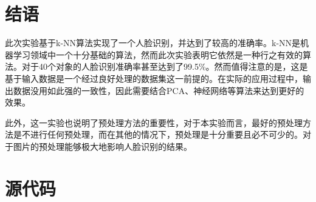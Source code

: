 \documentclass{article}
\begin{document}
\FloatBarrier
\section{结语}
\label{sec:jie_yu_}
\par 此次实验基于k-NN算法实现了一个人脸识别，并达到了较高的准确率。k-NN是机器学习领域中一个十分基础的算法，然而此次实验表明它依然是一种行之有效的算法。对于40个对象的人脸识别准确率甚至达到了99.5\%。然而值得注意的是，这是基于输入数据是一个经过良好处理的数据集这一前提的。在实际的应用过程中，输出数据没用如此强的一致性，因此需要结合PCA、神经网络等算法来达到更好的效果。
\par 此外，这一实验也说明了预处理方法的重要性，对于本实验而言，最好的预处理方法是不进行任何预处理，而在其他的情况下，预处理是十分重要且必不可少的。对于图片的预处理能够极大地影响人脸识别的结果。

\section{源代码}
\label{sec:yuan_dai_ma_}

\end{document}
